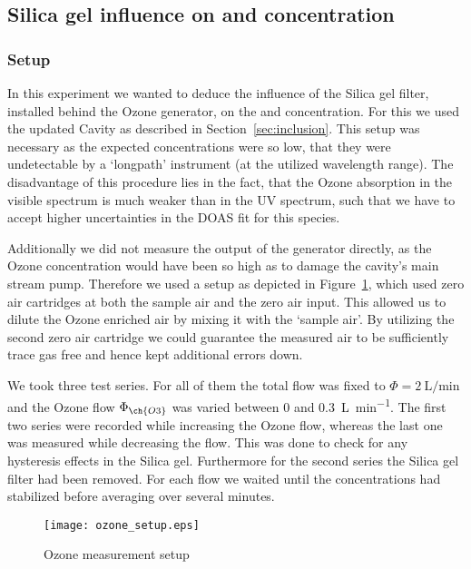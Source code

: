 \subsection{Silica gel influence on  and  concentration}
\label{sec:silica}

\subsubsection{Setup}
\label{sec:silica-setup}

In this experiment we wanted to deduce the influence of the Silica gel
filter, installed behind the Ozone generator, on the  and
 concentration. For this we used the updated Cavity as
described in Section~\ref{sec:inclusion}. This setup was necessary as
the expected  concentrations were so low, that they were
undetectable by a `longpath' instrument (at the utilized wavelength
range). The disadvantage of this procedure lies in the fact, that the
Ozone absorption in the visible spectrum is much weaker than in the UV
spectrum, such that we have to accept higher uncertainties in the DOAS
fit for this species.

Additionally we did not measure the output of the generator directly,
as the Ozone concentration would have been so high as to damage the cavity's
main stream pump. Therefore we used a setup as depicted
in Figure~\ref{fig:ozone-flow-setup}, which used zero air cartridges at
both the sample air and the zero air input. This allowed us to dilute
the Ozone enriched air by mixing it with the `sample air'. By
utilizing the second zero air cartridge we could guarantee the
measured air to be sufficiently trace gas free and hence kept
additional errors down. 

We took three test series. For all of them the total flow was fixed to
$\Phi = \SI{2}{\liter\per\minute}$ and the Ozone flow $\Phi_{\ch{O3}}$
was varied between \num{0} and \SI{0.3}{\liter\per\minute}. The first
two series were recorded while increasing the Ozone flow, whereas the
last one was measured while decreasing the flow. This was done to
check for any hysteresis effects in the Silica gel. Furthermore for
the second series the Silica gel filter had been removed. For each
flow we waited until the concentrations had stabilized before
averaging over several minutes.

\begin{figure}[htbp]
  \centering
  \texttt{[image: ozone\_setup.eps]}
  \caption{Ozone measurement setup}
  \label{fig:ozone-flow-setup}
\end{figure}

